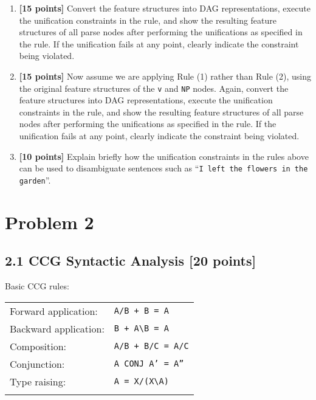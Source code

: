\documentclass[11pt,letterpaper]{article}
\begin{document}
\begin{enumerate}

\item {\bf [15 points]} Convert the feature structures into DAG representations, execute the unification constraints in the rule, and show the resulting feature structures of all parse nodes after performing the unifications as specified in the rule.  If the unification fails at any point, clearly indicate the constraint being violated.

\item {\bf [15 points]} Now assume we are applying Rule (1) rather than Rule (2), using the original feature structures of the {\tt v} and {\tt NP} nodes.  Again, convert the feature structures into DAG representations, execute the unification constraints in the rule, and show the resulting feature structures of all parse nodes after performing the unifications as specified in the rule.  If the unification fails at any point, clearly indicate the constraint being violated.

\item {\bf [10 points]} Explain briefly how the unification constraints in the rules above can be used to disambiguate sentences such as ``{\tt I left the flowers in the garden}''.

\end{enumerate}


\clearpage
\section*{Problem 2}

\subsection*{2.1 CCG Syntactic Analysis [20 points]}
\label{ss:ccg}

\noindent{}Basic CCG rules:
\newline

\noindent\begin{tabular}{ll}
Forward application: & \texttt{A/B + B = A} \\
Backward application: & \texttt{B + A\textbackslash{}B = A} \\
Composition: & \texttt{A/B + B/C = A/C} \\
Conjunction: & \texttt{A CONJ A' = A''} \\
Type raising: & \texttt{A = X/(X\textbackslash{}A)} \\
\newline
\end{tabular}
\end{document}
